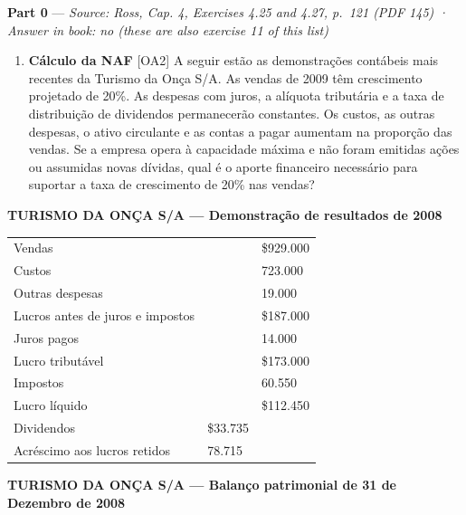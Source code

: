 \documentclass[11pt,a4paper]{article}
\providecommand{\tightlist}{\setlength{\itemsep}{0pt}\setlength{\parskip}{0pt}}
\begin{document}
\textbf{Part 0} --- \emph{Source: Ross, Cap. 4, Exercises 4.25 and 4.27, p.~121 (PDF 145) · Answer
in book: no (these are also exercise 11 of this list)}

\begin{enumerate}
\def\labelenumi{\arabic{enumi}.}
\setcounter{enumi}{24}
\tightlist
\item
  \textbf{Cálculo da NAF} {[}OA2{]} A seguir estão as demonstrações contábeis mais recentes da
  Turismo da Onça S/A. As vendas de 2009 têm crescimento projetado de 20\%. As despesas com juros, a
  alíquota tributária e a taxa de distribuição de dividendos permanecerão constantes. Os custos, as
  outras despesas, o ativo circulante e as contas a pagar aumentam na proporção das vendas. Se a
  empresa opera à capacidade máxima e não foram emitidas ações ou assumidas novas dívidas, qual é o
  aporte financeiro necessário para suportar a taxa de crescimento de 20\% nas vendas?
\end{enumerate}

\textbf{TURISMO DA ONÇA S/A --- Demonstração de resultados de 2008}

{\def\LTcaptype{none} %
\begin{longtable}[]{@{}lll@{}}
\toprule\noalign{}
\endhead
\bottomrule\noalign{}
\endlastfoot
Vendas & & \$929.000 \\
Custos & & 723.000 \\
Outras despesas & & 19.000 \\
Lucros antes de juros e impostos & & \$187.000 \\
Juros pagos & & 14.000 \\
Lucro tributável & & \$173.000 \\
Impostos & & 60.550 \\
Lucro líquido & & \$112.450 \\
Dividendos & \$33.735 & \\
Acréscimo aos lucros retidos & 78.715 & \\
\end{longtable}
}

\textbf{TURISMO DA ONÇA S/A --- Balanço patrimonial de 31 de Dezembro de 2008}
\end{document}
